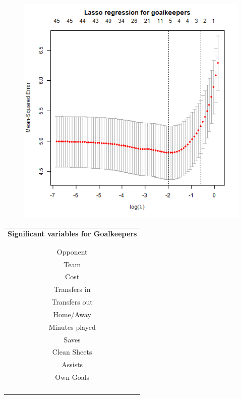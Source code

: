 \begin{table}[H]
\centering
\begin{minipage}{.5\textwidth}
  \centering
  \captionsetup{justification=centering}
    \begin{figure}[H]
        \centering
        \includegraphics[scale=0.4]{fig/chapter_6/lasso_GLK.png}
    \end{figure}
    \label{fig:lasso_GLK_1}
\end{minipage}%
\begin{minipage}{.5\textwidth}
  \centering
  \captionsetup{justification=centering}
    \begin{tabular}{c}
    \\
    \textbf{Significant variables for Goalkeepers }\\
    \\
    \\
Opponent                              \\
Team                                  \\
Cost                                  \\
Transfers in                          \\
Transfers out                         \\
Home/Away                             \\
Minutes played                        \\
Saves                                 \\
Clean Sheets                          \\
Assists                               \\
Own Goals                            
    \\
    \\
    \\
    \\
\\



\end{tabular}
\end{minipage}
\end{table}
